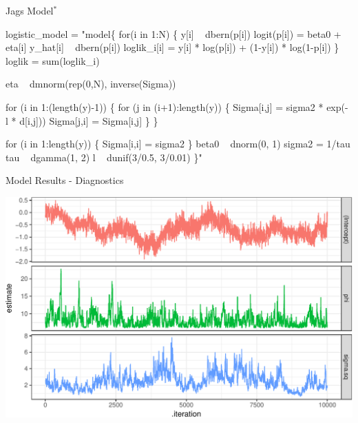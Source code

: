 \documentclass[11pt,ignorenonframetext,]{beamer}
\newenvironment{Shaded}{}{}
\newcommand{\NormalTok}[1]{#1}
\newcommand{\StringTok}[1]{\textcolor[rgb]{0.25,0.44,0.63}{#1}}
\let\oldShaded\Shaded
\let\endoldShaded\endShaded
\renewenvironment{Shaded}{\footnotesize\begin{spacing}{0.9}\oldShaded}{\endoldShaded\end{spacing}}
\let\oldverbatim\verbatim
\let\endoldverbatim\endverbatim
\newcommand{\scriptoutput}{
  \renewenvironment{Shaded}{\scriptsize\begin{spacing}{0.9}\oldShaded}{\endoldShaded\end{spacing}}
  \renewenvironment{verbatim}{\scriptsize\begin{spacing}{0.9}\oldverbatim}{\endoldverbatim\end{spacing}}
}
\begin{document}
\begin{frame}[fragile]{Jags Model\(^*\)}
\protect\hypertarget{jags-model}{}

\scriptoutput

\begin{Shaded}
\begin{Highlighting}[]
\NormalTok{logistic_model =}\StringTok{ "model\{}
\StringTok{  for(i in 1:N) \{}
\StringTok{    y[i] ~ dbern(p[i])}
\StringTok{    logit(p[i]) = beta0 + eta[i]}
\StringTok{    }
\StringTok{    y_hat[i] ~ dbern(p[i])}
\StringTok{    loglik_i[i] = y[i] * log(p[i]) + (1-y[i]) * log(1-p[i])}
\StringTok{  \}}
\StringTok{  loglik = sum(loglik_i)}

\StringTok{  eta ~ dmnorm(rep(0,N), inverse(Sigma))}

\StringTok{  for (i in 1:(length(y)-1)) \{}
\StringTok{    for (j in (i+1):length(y)) \{}
\StringTok{      Sigma[i,j] = sigma2 * exp(- l * d[i,j]))}
\StringTok{      Sigma[j,i] = Sigma[i,j]}
\StringTok{    \}}
\StringTok{  \}}

\StringTok{  for (i in 1:length(y)) \{}
\StringTok{    Sigma[i,i] = sigma2}
\StringTok{  \}  }
\StringTok{  }
\StringTok{  beta0 ~ dnorm(0, 1)}
\StringTok{  sigma2 = 1/tau}
\StringTok{  tau ~ dgamma(1, 2)}
\StringTok{  l ~ dunif(3/0.5, 3/0.01)}
\StringTok{\}"}
\end{Highlighting}
\end{Shaded}

\end{frame}

\begin{frame}{Model Results - Diagnostics}
\protect\hypertarget{model-results---diagnostics}{}

\begin{center}\includegraphics[width=\textwidth]{Lec15_files/figure-beamer/fit_log-1} \end{center}

\end{frame}
\end{document}
